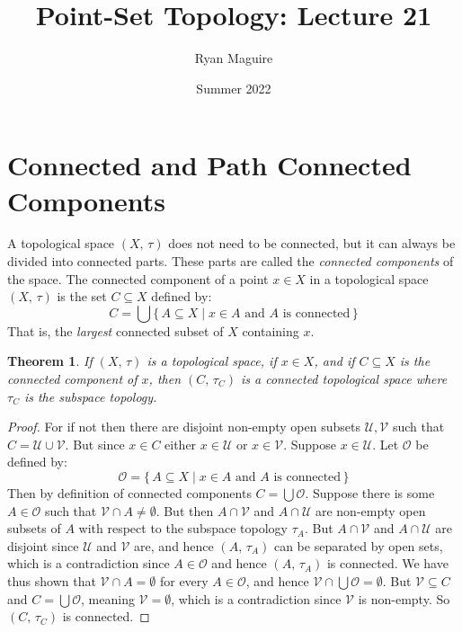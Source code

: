 \documentclass{article}
\title{Point-Set Topology: Lecture 21}
\author{Ryan Maguire}
\date{Summer 2022}
\theoremstyle{plain}
\newtheorem{theorem}{Theorem}[section]
\theoremstyle{normal}
\newenvironment{definition}{%
    \pushQED{\qed}\renewcommand{\qedsymbol}{$\blacksquare$}\definitionx%
}{%
    \popQED\enddefinitionx%
}
\begin{document}
    \maketitle
    \section{Connected and Path Connected Components}
        A topological space $(X,\,\tau)$ does not need to be connected, but it
        can always be divided into connected parts. These parts are called the
        \textit{connected components} of the space.
        \begin{definition}[\textbf{Connected Component}]
            The connected component of a point $x\in{X}$ in a topological space
            $(X,\,\tau)$ is the set $C\subseteq{X}$ defined by:
            \begin{equation}
                C=\bigcup\{\,A\subseteq{X}\;|\;
                    x\in{A}\textrm{ and }A\textrm{ is connected}\,\}
            \end{equation}
            That is, the \textit{largest} connected subset of $X$ containing
            $x$.
        \end{definition}
        \begin{theorem}
            If $(X,\,\tau)$ is a topological space, if $x\in{X}$, and if
            $C\subseteq{X}$ is the connected component of $x$, then
            $(C,\,\tau_{C})$ is a connected topological space where
            $\tau_{C}$ is the subspace topology.
        \end{theorem}
        \begin{proof}
            For if not then there are disjoint non-empty open subsets
            $\mathcal{U},\mathcal{V}$ such that $C=\mathcal{U}\cup\mathcal{V}$.
            But since $x\in{C}$ either $x\in\mathcal{U}$ or $x\in\mathcal{V}$.
            Suppose $x\in\mathcal{U}$. Let $\mathcal{O}$ be defined by:
            \begin{equation}
                \mathcal{O}=\{\,A\subseteq{X}\;|\;
                    x\in{A}\textrm{ and }A\textrm{ is connected}\,\}
            \end{equation}
            Then by definition of connected components $C=\bigcup\mathcal{O}$.
            Suppose there is some $A\in\mathcal{O}$ such that
            $\mathcal{V}\cap{A}\ne\emptyset$. But then
            $A\cap\mathcal{V}$ and $A\cap\mathcal{U}$ are non-empty open
            subsets of $A$ with respect to the subspace topology $\tau_{A}$.
            But $A\cap\mathcal{V}$ and $A\cap\mathcal{U}$ are disjoint since
            $\mathcal{U}$ and $\mathcal{V}$ are, and hence $(A,\,\tau_{A})$ can
            be separated by open sets, which is a contradiction since
            $A\in\mathcal{O}$ and hence $(A,\,\tau_{A})$ is connected. We have
            thus shown that $\mathcal{V}\cap{A}=\emptyset$ for every
            $A\in\mathcal{O}$, and hence
            $\mathcal{V}\cap\bigcup\mathcal{O}=\emptyset$. But
            $\mathcal{V}\subseteq{C}$ and $C=\bigcup\mathcal{O}$, meaning
            $\mathcal{V}=\emptyset$, which is a contradiction since
            $\mathcal{V}$ is non-empty. So $(C,\,\tau_{C})$ is connected.
        \end{proof}
\end{document}

